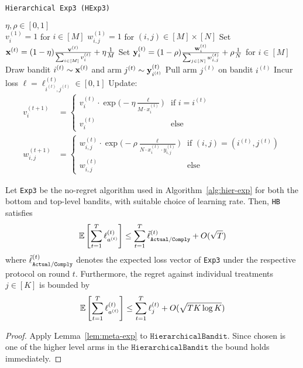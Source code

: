 \begin{algorithm}[tb]
   \caption{\texttt{Hierarchical Exp3 (HExp3)}}
   \label{alg:meta-exp2}
   \begin{algorithmic}   
       $\eta,\rho\in[0,1]$\\
      \STATE $v^{(1)}_{i}=1$ for $i\in[M]$
   	\STATE $w^{(1)}_{i,j}=1$ for $(i,j)\in[M]\times[N]$
	   \STATE Set ${\mathbf x}^{(t)} = (1-\eta) \frac{{\mathbf v}^{(t)}}{\sum_{i\in[M]} v^{(t)}_{i}} + \eta\frac{1}{M}$
	   \STATE Set ${\mathbf y}^{(t)}_{i} = (1-\rho)\frac{{\mathbf w}^{(t)}_{i}}{\sum_{j\in[N]} w^{(t)}_{i,j}} + \rho\frac{1}{N}$ for $i\in[M]$
	\STATE Draw bandit $i^{(t)}\sim {\mathbf x}^{(t)}$ and arm $j^{(t)}\sim {\mathbf y}^{(t)}_{i^{(t)}}$
	\STATE Pull arm $j^{(t)}$ on bandit $i^{(t)}$
	   \STATE Incur loss $\ell =\ell_{i^{(t)}, j^{(t)}}^{(t)}\in [0,1]$ 
	\STATE Update:
	\begin{align}
		v^{(t+1)}_i & = \begin{cases}
			v^{(t)}_{i}\cdot 
			\exp\big(-\eta \frac{\ell}{M\cdot x_{i}^{(t)}}\big) & \text{if } i=i^{(t)} \\
			v^{(t)}_{i} & \text{else}
		\end{cases}		 
		\\
		w^{(t+1)}_{i,j} & = \begin{cases}
			w^{(t)}_{i,j}\cdot \exp\big(-\rho\frac{\ell}{N\cdot x_i^{(t)}\cdot y_{i,j}^{(t)}}\big) 
			& \text{if }(i,j)=(i^{(t)}, j^{(t)}) \\
			w^{(t)}_{i,j} &\text{else}
		\end{cases}
	\end{align}
   	\ENDFOR
   	\end{algorithmic}
\end{algorithm}


\begin{thm}\label{thm:cexp}\eod
	Let \texttt{Exp3} be the no-regret algorithm used in Algorithm~\ref{alg:hier-exp} for both the bottom and top-level bandits, with suitable choice of learning rate. Then, \texttt{HB} satisfies
	\begin{equation}
		\operatorname*{\mathbb E}\left[\sum_{t=1}^T\ell^{(t)}_{a^{(t)}}\right]
		\leq \sum_{t=1}^T \tilde{\ell}^{(t)}_{{\texttt{Actual}}/{\texttt{Comply}}}
		+ O(\sqrt{T})
	\end{equation}
	where $\tilde{\ell}^{(t)}_{{\texttt{Actual}}/{\texttt{Comply}}}$ denotes the expected loss vector of \texttt{Exp3} under the respective protocol on round $t$. 
	Furthermore, the regret against individual treatments $j\in[K]$ is bounded by
	\begin{equation}
		\operatorname*{\mathbb E}\left[\sum_{t=1}^{T} \ell^{(t)}_{a^{(t)}}\right]
		\leq \sum_{t=1}^T\ell^{(t)}_{j}
		+ O(\sqrt{T K\log K})
	\end{equation}
\end{thm}

\begin{proof}
	Apply Lemma~\ref{lem:meta-exp} to  $\texttt{HierarchicalBandit}$. Since chosen is one of the higher level arms in the $\texttt{HierarchicalBandit}$ the bound holds immediately. 
\end{proof}


